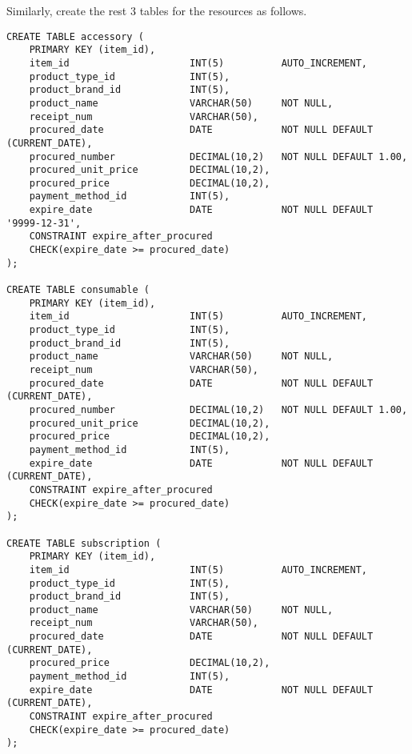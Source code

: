 Similarly, create the rest 3 tables for the resources as follows.
\begin{lstlisting}
CREATE TABLE accessory (
	PRIMARY KEY (item_id),
	item_id                     INT(5)          AUTO_INCREMENT,
	product_type_id             INT(5),
	product_brand_id            INT(5),
	product_name                VARCHAR(50)     NOT NULL,
	receipt_num                 VARCHAR(50),
	procured_date               DATE            NOT NULL DEFAULT (CURRENT_DATE),
	procured_number             DECIMAL(10,2)   NOT NULL DEFAULT 1.00,
	procured_unit_price         DECIMAL(10,2),
	procured_price              DECIMAL(10,2),
	payment_method_id           INT(5),
	expire_date                 DATE            NOT NULL DEFAULT '9999-12-31',
	CONSTRAINT expire_after_procured
	CHECK(expire_date >= procured_date)
);
	
CREATE TABLE consumable (
	PRIMARY KEY (item_id),
	item_id                     INT(5)          AUTO_INCREMENT,
	product_type_id             INT(5),
	product_brand_id            INT(5),
	product_name                VARCHAR(50)     NOT NULL,
	receipt_num                 VARCHAR(50),
	procured_date               DATE            NOT NULL DEFAULT (CURRENT_DATE),
	procured_number             DECIMAL(10,2)   NOT NULL DEFAULT 1.00,
	procured_unit_price         DECIMAL(10,2),
	procured_price              DECIMAL(10,2),
	payment_method_id           INT(5),
	expire_date                 DATE            NOT NULL DEFAULT (CURRENT_DATE),
	CONSTRAINT expire_after_procured
	CHECK(expire_date >= procured_date)
);
	
CREATE TABLE subscription (
	PRIMARY KEY (item_id),
	item_id                     INT(5)          AUTO_INCREMENT,
	product_type_id             INT(5),
	product_brand_id            INT(5),
	product_name                VARCHAR(50)     NOT NULL,
	receipt_num                 VARCHAR(50),
	procured_date               DATE            NOT NULL DEFAULT (CURRENT_DATE),
	procured_price              DECIMAL(10,2),
	payment_method_id           INT(5),
	expire_date                 DATE            NOT NULL DEFAULT (CURRENT_DATE),
	CONSTRAINT expire_after_procured
	CHECK(expire_date >= procured_date)
);
\end{lstlisting}

